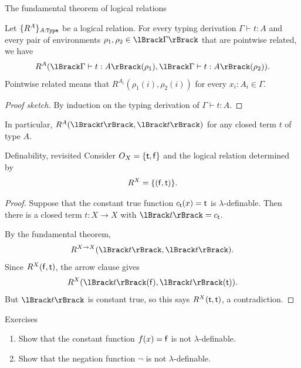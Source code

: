 \begin{frame}{The fundamental theorem of logical relations}
  \begin{theorem}\label{thm:fundamental_thm}
    Let $\{R^A\}_{A : \mathtt{Type}}$ be a logical relation.  For every typing
    derivation $\Gamma \vdash t : A$ and every pair of environments
    $\rho_1,\rho_2 \in \Brackets{\Gamma}$ that are pointwise related, we have
    \[
      R^A(\Brackets{\Gamma \vdash t : A}(\rho_1),
          \Brackets{\Gamma \vdash t : A}(\rho_2)).
    \]
    Pointwise related means that $R^{A_i}(\rho_1(i),\rho_2(i))$ for every
    $x_i : A_i \in \Gamma$.
  \end{theorem}

  \begin{proof}[Proof sketch]
    By induction on the typing derivation of $\Gamma \vdash t : A$.
  \end{proof}

  In particular, $R^A(\Brackets{t},\Brackets{t})$ for any closed term $t$ of
  type $A$.
\end{frame}

\begin{frame}{Definability, revisited}
  Consider $O_X = \{\mathsf{t},\mathsf{f}\}$ and the logical relation determined by
  \[
    R^{X} = \{(\mathsf{f},\mathsf{t})\}.
  \]

  \begin{proof}
    Suppose that the constant true function $c_{\mathsf{t}}(x)=\mathsf{t}$ is
    $\lambda$-definable.  Then there is a closed term $t : X \to X$ with
    $\Brackets{t}=c_{\btt}$.

    By the fundamental theorem,
    \[
      R^{X \to X}(\Brackets{t},\Brackets{t}).
    \]
    Since $R^X(\mathsf{f},\mathsf{t})$, the arrow clause gives
    \[
      R^X(\Brackets{t}(\bff),\Brackets{t}(\btt)).
    \]
    But $\Brackets{t}$ is constant true, so this says
    $R^X(\mathsf{t},\mathsf{t})$, a contradiction.
  \end{proof}
\end{frame}

\begin{frame}{Exercises}
  \begin{enumerate}
    \item Show that the constant function $f(x) = \mathsf{f}$ is not $\lambda$-definable.
    \item Show that the negation function $\neg$ is not $\lambda$-definable.
  \end{enumerate}
\end{frame}

